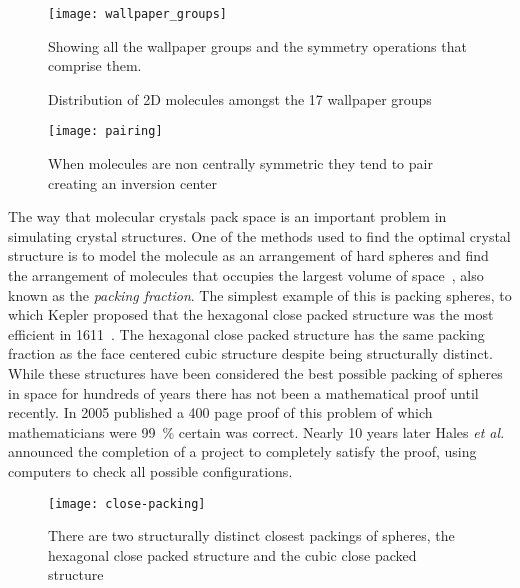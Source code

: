 \begin{figure}
    \centering
    \texttt{[image: wallpaper\_groups]}
    \caption{Showing all the wallpaper groups and the symmetry operations that comprise them.}
    \label{fig:wallpaper}
\end{figure}

\begin{figure}
    \centering
    \caption{Distribution of 2D molecules amongst the 17 wallpaper groups}
    \label{fig:wallpaper dist}
\end{figure}

\begin{figure}
    \centering
    \texttt{[image: pairing]}
    \caption{When molecules are non centrally symmetric they tend to pair creating an inversion center}
    \label{fig:molecule pair}
\end{figure}

The way that molecular crystals pack space is an important problem in simulating crystal structures. One of the methods used to find the optimal crystal structure is to model the molecule as an arrangement of hard spheres and find the arrangement of molecules that occupies the largest volume of space~\cite{kitaigorodskii:73}, also known as the \emph{packing fraction}. The simplest example of this is packing spheres, to which Kepler proposed that the hexagonal close packed structure was the most efficient in 1611~\cite{kepler:1611}. The hexagonal close packed structure has the same packing fraction as the face centered cubic structure despite being structurally distinct. While these structures have been considered the best possible packing of spheres in space for hundreds of years there has not been a mathematical proof until recently. In 2005 \textcite{hales:05} published a 400 page proof of this problem of which mathematicians were \SI{99}{\percent} certain was correct. Nearly 10 years later Hales {\em et al.}~\cite{hales:14} announced the completion of a project to completely satisfy the proof, using computers to check all possible configurations. 

\begin{figure}
    \texttt{[image: close-packing]}
    \caption{There are two structurally distinct closest packings of spheres, the hexagonal close packed structure and the cubic close packed structure}
    \label{fig:sphere packing}
\end{figure}

